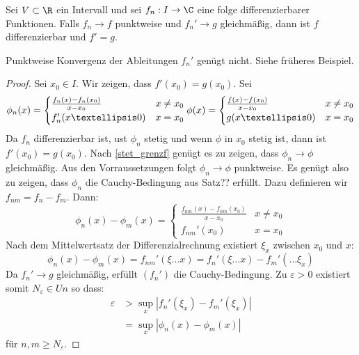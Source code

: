 \documentclass[a4paper,10pt]{scrartcl}
\begin{document}
\begin{thm} \label{12.3}
Sei $V\subset\R$ ein Intervall und sei $f_n:I\to\C$ eine folge differenzierbarer Funktionen.
Falls $f_n\to f$ punktweise und $f_n'\to g$ gleichmäßig, dann ist $f$ differenzierbar und $f'=g$.
\begin{note}
Punktweise Konvergenz der Ableitungen $f_n'$ genügt nicht. Siehe früheres Beispiel.
\end{note}

\begin{proof}
Sei $x_0\in I$. Wir zeigen, dass $f'(x_0)=g(x_0)$.
Sei
\[
\phi_n(x)=\begin{cases}
\frac{f_n(x)-f_n(x_0)}{x-x_0}&x\neq x_0\\
f_n'(x…0)&x=x_0
\end{cases}\\
\phi(x)=\begin{cases}
\frac{f(x)-f(x_0)}{x-x_0}&x\neq x_0\\
g(x…0)&x=x_0
\end{cases}
\]
Da $f_n$ differenzierbar ist, ust $\phi_n$ stetig und wenn $\phi$ in $x_0$ stetig ist, dann ist $f'(x_0)=g(x_0)$.
Nach \ref{stet_grenzf} genügt es zu zeigen, dass $\phi_n\to\phi$ gleichmäßig.
Aus den Vorraussetzungen folgt $\phi_n\to\phi$ punktweise.
Es genügt also zu zeigen, dass $\phi_n$ die Cauchy-Bedingung aus Satz?? erfüllt.
Dazu definieren wir $f_{nm}=f_n-f_m$.
Dann:
\[
\phi_n(x)-\phi_m(x)=\begin{cases}
\frac{f_{nm}(x)-f_{nm}(x_0)}{x-x_0}& x\neq x_0\\
f_{nm}'(x_0) & x=x_0
\end{cases}
\]
Nach dem Mittelwertsatz der Differenzialrechnung existiert $\xi_x$ zwischen $x_0$ und $x$:
\[
\phi_n(x)-\phi_m(x)= f_{nm}'(\xi…x)=f_n'(\xi…x)-f_m'(…\xi_x)
\]
Da $f_n'\to g$ gleichmäßig, erfüllt $(f_n')$ die Cauchy-Bedingung. 
Zu $\varepsilon>0$ existiert somit $N_\varepsilon\in Un$ so dass:
\begin{align*}
\varepsilon&>\sup_x|f_n'(\xi_x)-f_m'(\xi_x)|\\
&=\sup_x|\phi_n(x)-\phi_m(x)|
\end{align*}
für $n,m\ge N_\varepsilon$.
\end{proof}
\end{thm}
\end{document}
